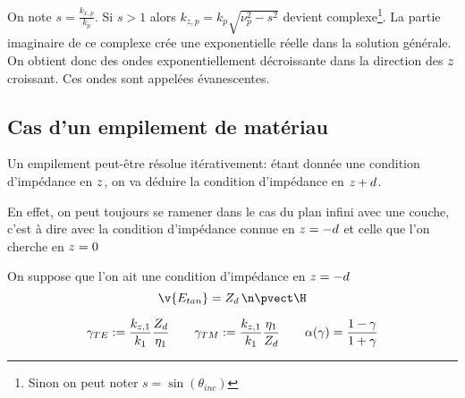 On note $s=\frac{k_{x,p}}{k_p}$. Si $s>1$ alors $k_{z,p} = k_p\sqrt{\nu_p^2-s^2}$ devient complexe\footnote{Sinon on peut noter $s=\sin(\theta_{inc})$}. La partie imaginaire de ce complexe crée une exponentielle réelle dans la solution générale. On obtient donc des ondes exponentiellement décroissante dans la direction des ${z}$ croissant. Ces ondes sont appelées évanescentes.

\subsection{Cas d'un empilement de matériau}

Un empilement peut-être résolue itérativement: étant donnée une condition d'impédance en ${z}$, on va déduire la condition d'impédance en ${z}+d$.

En effet, on peut toujours se ramener dans le cas du plan infini avec une couche, c'est à dire avec la condition d'impédance connue en ${z}=-d$ et celle que l'on cherche en ${z}=0$

On suppose que l'on ait une condition d'impédance en ${z}=-d$\[
  \v { E_{tan}}=Z_d \, \n \pvect  \H
\]


\begin{align*}
\gamma_{TE} := \dfrac{k_{{z},1}}{k_1} \dfrac{Z_d}{\eta_1} \qquad
\gamma_{TM} := \dfrac{k_{{z},1}}{k_1}  \frac{\eta_1}{Z_d}  \qquad
\alpha(\gamma) = \frac{1-\gamma}{1+\gamma}
\end{align*}

